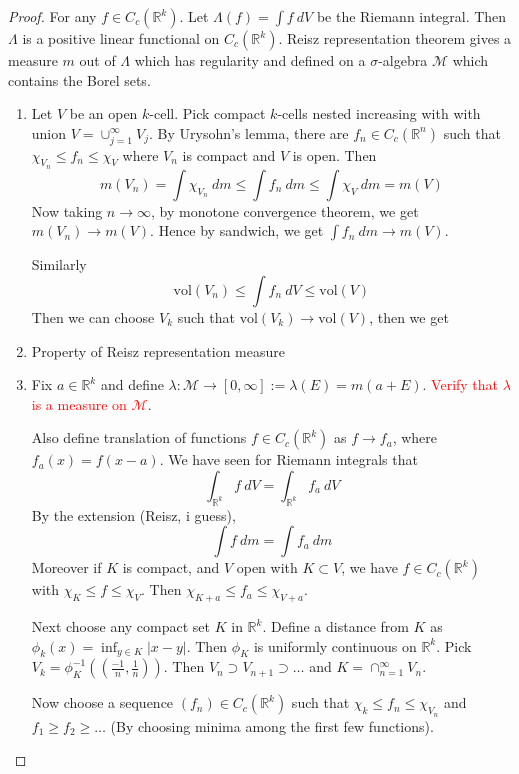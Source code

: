 \begin{proof}
For any $f \in C_c(\mathbb{R}^{k})$. Let $\Lambda(f) = \int f \ dV$
be the Riemann integral. Then $ \Lambda$ is a positive linear
functional on $C_c(\mathbb{R}^k)$. Reisz representation theorem gives
a measure $m$ out of $\Lambda$ which has regularity and defined on a
$\sigma$-algebra $\mathcal{M}$ which contains the Borel sets.
\begin{enumerate}[label=(\arabic*)]
  \item   Let $V$ be an open $k$-cell. Pick compact $k$-cells nested
    increasing with with union $V  = \cup_{j = 1}^{\infty} V_j$. By
    Urysohn's lemma, there are $f_n \in C_c(\mathbb{R}^n)$ such that
    $\chi_{V_n} \le f_n \le \chi_V$ where $V_n$ is compact and $V$ is
    open. Then \[
      m(V_n) = \int  \chi_{V_n} \ d m \le \int  f_n \ d m \le \int
      \chi_{V} \ d m = m(V)
    \]
    Now taking $ n \to \infty$, by monotone convergence theorem, we get
    $m(V_n) \to m(V)$. Hence by sandwich, we get $\int  f_n \ d m \to m(V)$.

    Similarly $$\textrm{vol}(V_n) \le \int  f_n \ dV \le \textrm{vol}(V)$$
    Then we can choose $V_k$ such that $\textrm{vol}(V_k) \to
    \textrm{vol}(V)$, then we get

  \item Property of Reisz representation measure
  \item Fix $a \in \mathbb{R}^k$ and define $ \lambda: \mathcal{M} \to
    [0, \infty] := \lambda(E) = m(a+E)$.
    \textcolor{red}{Verify that
    $\lambda$ is a measure on $\mathcal{M}$}.

    Also define translation of functions $f \in C_c(\mathbb{R}^k)$ as
    $f \to f_a$, where $ f_a(x) = f( x-a)$.
    We have seen for Riemann integrals that \[
      \int_{\mathbb{R}^k}  f \ d V = \int_{\mathbb{R}^k}  f_a \ d V
    \]
    By the extension (Reisz, i guess), \[
      \int  f \ d m = \int  f_a \ d m
    \]
    Moreover if $K$ is compact, and $V$ open with $K \subset V$, we
    have $f \in C_c( \mathbb{R}^k)$ with $\chi_K \le f \le \chi_V$.
    Then $\chi_{K+a} \le f_a \le \chi_{V+a}$.

    Next choose any compact set $K$ in $\mathbb{R}^k$. Define a
    distance from $K$ as $\phi_k(x) = \inf_{y \in K}|x - y|$. Then
    $\phi_K$ is uniformly continuous on $\mathbb{R}^k$. Pick $V_k =
    \phi_K^{-1}(( \frac{-1}{n}, \frac{1}{n}))$. Then $ V_n \supset
    V_{n+1} \supset \ldots$ and $K = \cap_{n = 1}^{\infty}V_n$.

    Now choose a sequence $(f_n) \in C_c( \mathbb{R}^k)$ such that
    $\chi_k \le f_n \le \chi_{V_n}$ and $ f_1 \ge f_2 \ge \ldots$ (By
    choosing minima among the first few functions).


\end{enumerate}
\end{proof}
